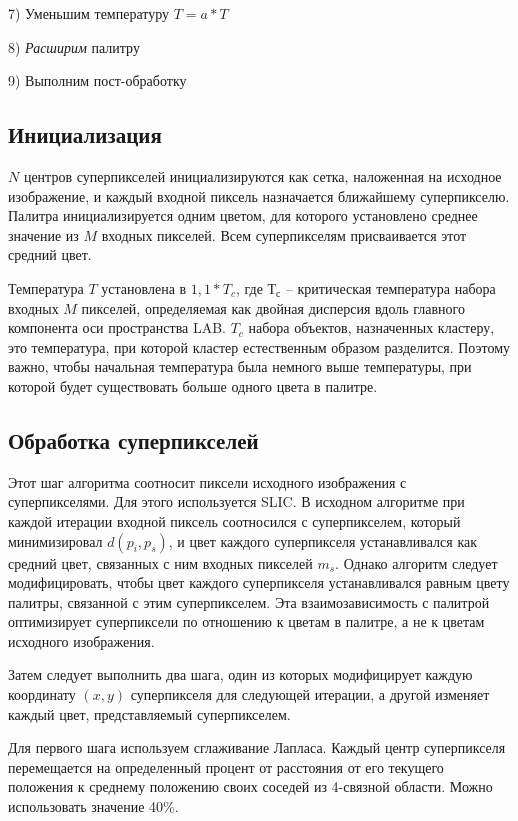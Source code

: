 \documentclass[a4paper,12pt]{report}
\theoremstyle{remark}
\begin{document}
7)          Уменьшим температуру $T = a*T$

8)          \textit{Расширим} палитру

9)  Выполним пост-обработку

\subsection{Инициализация}

$N$ центров суперпикселей инициализируются как сетка, наложенная на исходное изображение, и каждый входной пиксель назначается ближайшему суперпикселю. Палитра инициализируется одним цветом, для которого установлено среднее значение из $M$ входных пикселей. Всем суперпикселям присваивается этот средний цвет.

Температура $T$ установлена в $1,1*T_c$, где $Т_с$ – критическая температура набора входных $M$ пикселей, определяемая как двойная дисперсия вдоль главного компонента оси пространства LAB. $T_c$ набора объектов, назначенных кластеру, это температура, при которой кластер естественным образом разделится. Поэтому важно, чтобы начальная температура была немного выше температуры, при которой будет существовать больше одного цвета в палитре.

\subsection{Обработка суперпикселей}

Этот шаг алгоритма соотносит пиксели исходного изображения с суперпикселями. Для этого используется SLIC. В исходном алгоритме при каждой итерации входной пиксель соотносился с суперпикселем, который минимизировал $d(p_i, p_s)$, и цвет каждого суперпикселя устанавливался как средний цвет, связанных с ним входных пикселей $m_s$. Однако алгоритм следует модифицировать, чтобы цвет каждого суперпикселя устанавливался равным цвету палитры, связанной с этим суперпикселем. Эта взаимозависимость с палитрой оптимизирует суперпиксели по отношению к цветам в палитре, а не к цветам исходного изображения.

Затем следует выполнить два шага, один из которых модифицирует каждую координату $(x, y)$ суперпикселя для следующей итерации, а другой изменяет каждый цвет, представляемый суперпикселем.

Для первого шага используем сглаживание Лапласа. Каждый центр суперпикселя перемещается на определенный процент от расстояния от его текущего положения к среднему положению своих соседей из 4-связной области. Можно использовать значение 40\%.
\end{document}
